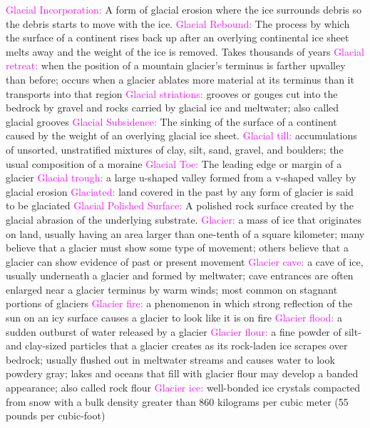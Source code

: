 \documentclass{article}
\newcommand{\pink}[1]{\textcolor{magenta}{#1}}
\newcommand{\vocab}[1]{{\pink{#1}}}
\begin{document}
\begin{multicols*}{4}
		\vocab{Glacial Incorporation: } A form of glacial erosion where the ice surrounds debris so the debris starts to move with the ice.  
		\vocab{Glacial Rebound: } The process by which the surface of a continent rises back up after an overlying continental ice sheet melts away and the weight of the ice is removed. Takes thousands of years  
		\vocab{        Glacial retreat: } when the position of a mountain glacier's terminus is farther upvalley than before; occurs when a glacier ablates more material at its terminus than it transports into that region 
		\vocab{        Glacial striations: } grooves or gouges cut into the bedrock by gravel and rocks carried by glacial ice and meltwater; also called glacial grooves 
		\vocab{Glacial Subsidence: } The sinking of the surface of a continent caused by the weight of an overlying glacial ice sheet.  
		\vocab{        Glacial till: } accumulations of unsorted, unstratified mixtures of clay, silt, sand, gravel, and boulders; the usual composition of a moraine 
		\vocab{Glacial Toe: } The leading edge or margin of a glacier  
		\vocab{        Glacial trough: } a large u-shaped valley formed from a v-shaped valley by glacial erosion 
		\vocab{        Glaciated: } land covered in the past by any form of glacier is said to be glaciated 
		\vocab{Glacial Polished Surface: } A polished rock surface created by the glacial abrasion of the underlying substrate.  
		\vocab{        Glacier: } a mass of ice that originates on land, usually having an area larger than one-tenth of a square kilometer; many believe that a glacier must show some type of movement; others believe that a glacier can show evidence of past or present movement 
		\vocab{        Glacier cave: } a cave of ice, usually underneath a glacier and formed by meltwater; cave entrances are often enlarged near a glacier terminus by warm winds; most common on stagnant portions of glaciers 
		\vocab{        Glacier fire: } a phenomenon in which strong reflection of the sun on an icy surface causes a glacier to look like it is on fire 
		\vocab{        Glacier flood: } a sudden outburst of water released by a glacier 
		\vocab{        Glacier flour: } a fine powder of silt- and clay-sized particles that a glacier creates as its rock-laden ice scrapes over bedrock; usually flushed out in meltwater streams and causes water to look powdery gray; lakes and oceans that fill with glacier flour may develop a banded appearance; also called rock flour 
		\vocab{        Glacier ice: } well-bonded ice crystals compacted from snow with a bulk density greater than 860 kilograms per cubic meter (55 pounds per cubic-foot) 

\end{multicols*}
\end{document}
